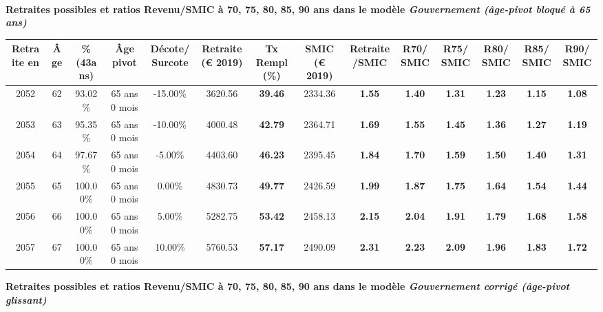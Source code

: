  ~\\{\bf \noindent Retraites possibles et ratios Revenu/SMIC à 70, 75, 80, 85, 90 ans dans le modèle \emph{Gouvernement (âge-pivot bloqué à 65 ans)}}  
 
\begin{adjustbox}{max width=\textwidth} 
\begin{tabular}[htb]{|c|c||c|c|c||c|c||c|c||c|c|c|c|c|} 
\hline 
 Retraite en &  Âge &  \%(43ans) &  Âge pivot &  Décote/Surcote &  Retraite (\euro{} 2019) &  Tx Rempl(\%) &  SMIC (\euro{} 2019) &  Retraite/SMIC &  R70/SMIC &  R75/SMIC &  R80/SMIC &  R85/SMIC &  R90/SMIC \\ 
\hline \hline 
 2052 &  62 &  93.02\% &  65 ans 0 mois &  -15.00\% &  3620.56 &  {\bf 39.46} &  2334.36 &  {\bf 1.55} &  {\bf 1.40} &  {\bf 1.31} &  {\bf 1.23} &  {\bf 1.15} &  {\bf 1.08} \\ 
\hline 
 2053 &  63 &  95.35\% &  65 ans 0 mois &  -10.00\% &  4000.48 &  {\bf 42.79} &  2364.71 &  {\bf 1.69} &  {\bf 1.55} &  {\bf 1.45} &  {\bf 1.36} &  {\bf 1.27} &  {\bf 1.19} \\ 
\hline 
 2054 &  64 &  97.67\% &  65 ans 0 mois &  -5.00\% &  4403.60 &  {\bf 46.23} &  2395.45 &  {\bf 1.84} &  {\bf 1.70} &  {\bf 1.59} &  {\bf 1.50} &  {\bf 1.40} &  {\bf 1.31} \\ 
\hline 
 2055 &  65 &  100.00\% &  65 ans 0 mois &  0.00\% &  4830.73 &  {\bf 49.77} &  2426.59 &  {\bf 1.99} &  {\bf 1.87} &  {\bf 1.75} &  {\bf 1.64} &  {\bf 1.54} &  {\bf 1.44} \\ 
\hline 
 2056 &  66 &  100.00\% &  65 ans 0 mois &  5.00\% &  5282.75 &  {\bf 53.42} &  2458.13 &  {\bf 2.15} &  {\bf 2.04} &  {\bf 1.91} &  {\bf 1.79} &  {\bf 1.68} &  {\bf 1.58} \\ 
\hline 
 2057 &  67 &  100.00\% &  65 ans 0 mois &  10.00\% &  5760.53 &  {\bf 57.17} &  2490.09 &  {\bf 2.31} &  {\bf 2.23} &  {\bf 2.09} &  {\bf 1.96} &  {\bf 1.83} &  {\bf 1.72} \\ 
\hline 
\hline 
\end{tabular} 
\end{adjustbox} 
 
 \vspace{0.1cm} 
{\bf \noindent Retraites possibles et ratios Revenu/SMIC à 70, 75, 80, 85, 90 ans dans le modèle \emph{Gouvernement corrigé (âge-pivot glissant)}}  
 
